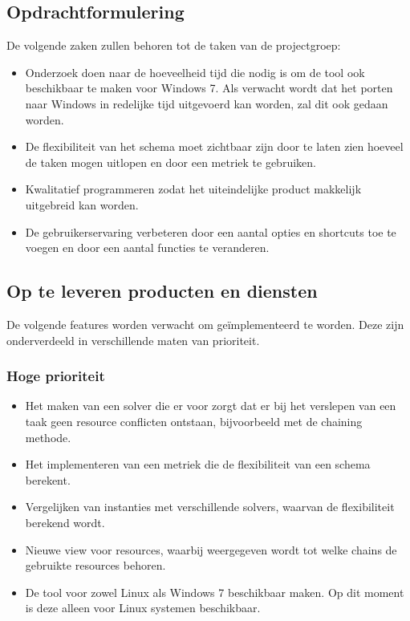 \subsection{Opdrachtformulering}
De volgende zaken zullen behoren tot de taken van de projectgroep:
\begin{itemize}
	\item Onderzoek doen naar de hoeveelheid tijd die nodig is om de tool ook beschikbaar te maken voor Windows 7. Als verwacht wordt dat het porten naar Windows in redelijke tijd uitgevoerd kan worden, zal dit ook gedaan worden. 
	\item De flexibiliteit van het schema moet zichtbaar zijn door te laten zien hoeveel de taken mogen uitlopen en door een metriek te gebruiken.
	\item Kwalitatief programmeren zodat het uiteindelijke product makkelijk uitgebreid kan worden.
	\item De gebruikerservaring verbeteren door een aantal opties en shortcuts toe te voegen en door een aantal functies te veranderen.
\end{itemize}

\subsection{Op te leveren producten en diensten}
De volgende features worden verwacht om ge\"implementeerd te worden. Deze zijn onderverdeeld in verschillende maten van prioriteit.

\subsubsection*{Hoge prioriteit}
\begin{itemize}
	\item Het maken van een solver die er voor zorgt dat er bij het verslepen van een taak geen resource conflicten ontstaan, bijvoorbeeld met de chaining methode.
	\item Het implementeren van een metriek die de flexibiliteit van een schema berekent.
	\item Vergelijken van instanties met verschillende solvers, waarvan de flexibiliteit berekend wordt.
	\item Nieuwe view voor resources, waarbij weergegeven wordt tot welke chains de gebruikte resources behoren.
	\item De tool voor zowel Linux als Windows 7 beschikbaar maken. Op dit moment is deze alleen voor Linux systemen beschikbaar.
\end{itemize}


